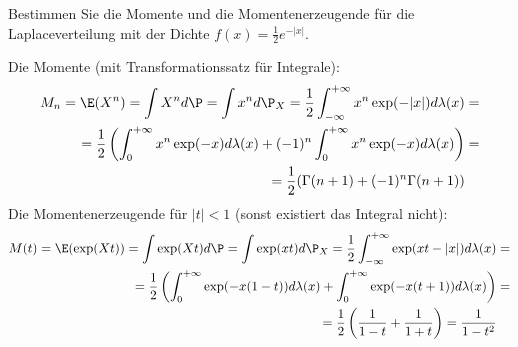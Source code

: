\begin{exercise}
Bestimmen Sie die Momente und die Momentenerzeugende für die Laplaceverteilung
mit der Dichte $f(x) = \frac{1}{2}e^{-|x|}$.
\end{exercise}

\begin{solution}
Die Momente (mit Transformationssatz für Integrale):
\begin{align*}
  M_n = \E(X^n) = \int X^nd\P = \int x^nd\P_X = \frac{1}{2}\int_{-\infty}^{+\infty} x^n\exp(-|x|) d\lambda(x) &=\\
  = \frac{1}{2}\left(\int_{0}^{+\infty} x^n\exp(-x) d\lambda(x) +(-1)^n\int_{0}^{+\infty} x^n\exp(-x) d\lambda(x)\right) &= \\
  = \frac{1}{2}(\Gamma(n+1)+(-1)^n\Gamma(n+1))&
\end{align*}
Die Momentenerzeugende für $|t| < 1$ (sonst existiert das Integral nicht):
\begin{align*}
  M(t) = \E (\exp(Xt)) = \int\exp(Xt)d\P = \int \exp (xt)d\P_X = \frac{1}{2}\int_{-\infty}^{+\infty} \exp(xt -|x|) d\lambda (x) &=\\
  = \frac{1}{2}\left(\int_{0}^{+\infty} \exp(-x(1-t)) d\lambda(x) + \int_{0}^{+\infty}\exp(-x(t+1)) d\lambda(x)\right) &= \\
  = \frac{1}{2}\left(\frac{1}{1-t}+\frac{1}{1+t}\right) = \frac{1}{1-t^2}&
\end{align*}
\end{solution}
